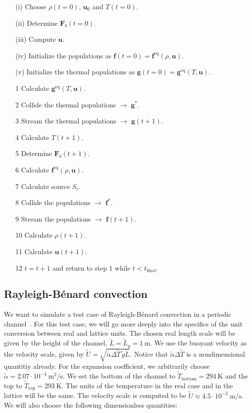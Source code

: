 \begin{itemize}\label{it:Algorithm thermal Lattice Boltzmann}
    \item[(i)] Choose $\rho(t=0)$, $\bm{u}_0$ and $T(t=0)$.
    \item[(ii)] Determine $\bm{F}_b(t=0)$.
    \item[(iii)] Compute $\bm{u}$. 
    \item[(iv)] Initialize the populations as $\bm{f}(t=0) = \bm{f}^{\text{eq}}(\rho, \bm{u})$. 
    \item[(v)] Initialize the thermal populations as $\bm{g}(t=0) = \bm{g}^{\text{eq}}(T, \bm{u})$. 
    \item[1] Calculate $\bm{g}^{\text{eq}}(T, \bm{u})$.
    \item[2] Collide the thermal populations $\rightarrow$ $\bm{g}^{\ast}$.
    \item[3] Stream the thermal populations $\rightarrow$ $\bm{g}(t + 1)$.
    \item[4] Calculate $T(t+1)$.
    \item[5] Determine $\bm{F}_b(t+1)$.
    \item[6] Calculate $\bm{f}^{\text{eq}}(\rho, \bm{u})$.
    \item[7] Calculate source $S_i$.
    \item[8] Collide the populations $\rightarrow$ $\bm{f}^{\ast}$.
    \item[9] Stream the populations $\rightarrow$ $\bm{f}(t + 1)$.
    \item[10] Calculate $\rho(t + 1)$.
    \item[11] Calculate $\bm{u}(t + 1)$.
    \item[12] $t = t + 1$ and return to step 1 while $t < t_{\text{final}}$.
\end{itemize}

\subsection{Rayleigh-Bénard convection}
We want to simulate a test case of Rayleigh-Bénard convection in a periodic channel~\cite{Rayleigh}. For this test case, we will go more deeply into the specifics of the unit conversion between real and lattice units. The chosen real length scale will be given by the height of the channel, $\widetilde{L} = \widetilde{L}_y = 1~\text{m}$. We use the buoyant velocity as the velocity scale, given by $\widetilde{U} = \sqrt{\widetilde{\alpha}\Delta\widetilde{T}\, \widetilde{g}\widetilde{L}}$. Notice that $\widetilde{\alpha}\Delta\widetilde{T}$ is a nondimensional quantitiy already. For the expansion coefficient, we arbitrarily choose $\widetilde{\alpha} = 2.07 \cdot 10^{-4}~\text{m}^2/\text{s}$. We set the bottom of the channel to $\widetilde{T}_{\text{bottom}} = 294~\text{K}$ and the top to $\widetilde{T}_{\text{top}} = 293~\text{K}$. The units of the temperature in the real case and in the lattice will be the same. The velocity scale is computed to be $\widetilde{U} \approx 4.5 \cdot 10^{-2}~\text{m}/\text{s}$. We will also choose the following dimensionless quantities:

